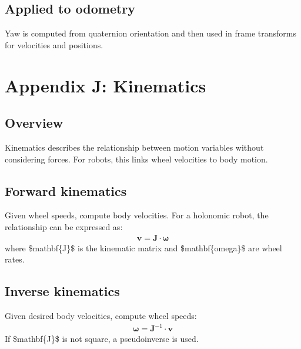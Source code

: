 \documentclass[letterpaper,10pt,english]{sphinxmanual}
\begin{document}
\section{Applied to odometry}
\label{\detokenize{appendix_i_quaternions:applied-to-odometry}}
\sphinxAtStartPar
Yaw is computed from quaternion orientation and then used in frame transforms
for velocities and positions.


\chapter{Appendix J: Kinematics}
\label{\detokenize{appendix_j_kinematics:appendix-j-kinematics}}\label{\detokenize{appendix_j_kinematics::doc}}

\section{Overview}
\label{\detokenize{appendix_j_kinematics:overview}}
\sphinxAtStartPar
Kinematics describes the relationship between motion variables without
considering forces. For robots, this links wheel velocities to body motion.


\section{Forward kinematics}
\label{\detokenize{appendix_j_kinematics:forward-kinematics}}
\sphinxAtStartPar
Given wheel speeds, compute body velocities. For a holonomic robot, the
relationship can be expressed as:
\begin{equation*}
\begin{split}\mathbf{v} = \mathbf{J} \cdot \mathbf{\omega}\end{split}
\end{equation*}
\sphinxAtStartPar
where \$mathbf\{J\}\$ is the kinematic matrix and \$mathbf\{omega\}\$ are wheel rates.


\section{Inverse kinematics}
\label{\detokenize{appendix_j_kinematics:inverse-kinematics}}
\sphinxAtStartPar
Given desired body velocities, compute wheel speeds:
\begin{equation*}
\begin{split}\mathbf{\omega} = \mathbf{J}^{-1} \cdot \mathbf{v}\end{split}
\end{equation*}
\sphinxAtStartPar
If \$mathbf\{J\}\$ is not square, a pseudoinverse is used.
\end{document}
